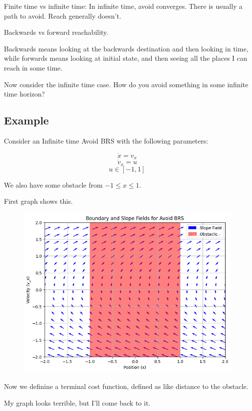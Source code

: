 \documentclass{article}
\begin{document}
Finite time vs infinite time: In infinite time, avoid converges. There is usually a path to avoid. Reach generally doesn't. 

Backwards vs forward reachability.

Backwards means looking at the backwards destination and then looking in time, while forwards means looking at initial state, and then seeing all the places I can reach in some time. 

Now consider the infinite time case. How do you avoid something in some infinite time horizon?

\subsection{Example}
Consider an Infinite time Avoid BRS with the following parameters:

\[\dot x = v_x \] 
\[\dot v_x = u \] 
\[ u \in [-1, 1] \]

We also have some obstacle from $-1 \leq x \leq 1$. 

First graph shows this. 
\begin{figure}[h!]
    \includegraphics[width = \textwidth]{screenshot11oct1.png}
\end{figure}


Now we definine a terminal cost function, defined as like distance to the obstacle. 

My graph looks terrible, but I'll come back to it. 
\end{document}
